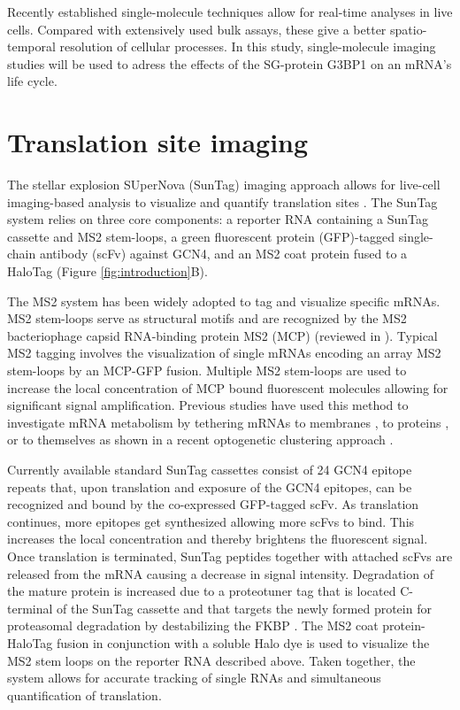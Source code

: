 Recently established single-molecule techniques allow for real-time analyses in live cells.
Compared with extensively used bulk assays, these give a better spatio-temporal resolution of cellular processes.
In this study, single-molecule imaging studies will be used to adress the effects of the SG-protein G3BP1 on an mRNA's life cycle.

    
\section{Translation site imaging} \label{translation_site_imaging}

The stellar explosion SUperNova (SunTag) imaging approach allows for live-cell imaging-based analysis to visualize and quantify translation sites \cite{tanenbaum_protein-tagging_2014}.
The SunTag system relies on three core components: a reporter RNA containing a SunTag cassette and MS2 stem-loops, a green fluorescent protein (GFP)-tagged single-chain antibody (scFv) against GCN4, and an MS2 coat protein fused to a HaloTag (Figure \ref{fig:introduction}B).

The MS2 system has been widely adopted to tag and visualize specific mRNAs.
MS2 stem-loops serve as structural motifs and are recognized by the MS2 bacteriophage capsid RNA-binding protein MS2 (MCP) (reviewed in \cite{george_intracellular_2018}).
Typical MS2 tagging involves the visualization of single mRNAs encoding an array MS2 stem-loops by an MCP-GFP fusion.
Multiple MS2 stem-loops are used to increase the local concentration of MCP bound fluorescent molecules allowing for significant signal amplification.
Previous studies have used this method to investigate mRNA metabolism by tethering mRNAs to membranes \cite{genz_association_2013}, to proteins \cite{bos_tethered_2016}, or to themselves as shown in a recent optogenetic clustering approach \cite{kim_optogenetic_2020}.

Currently available standard SunTag cassettes consist of 24 GCN4 epitope repeats that, upon translation and exposure of the GCN4 epitopes, can be recognized and bound by the co-expressed GFP-tagged scFv.
As translation continues, more epitopes get synthesized allowing more scFvs to bind.
This increases the local concentration and thereby brightens the fluorescent signal.
Once translation is terminated, SunTag peptides together with attached scFvs are released from the mRNA causing a decrease in signal intensity.
Degradation of the mature protein is increased due to a proteotuner tag that is located C-terminal of the SunTag cassette and that targets the newly formed protein for proteasomal degradation by destabilizing the FKBP \cite{azevedo_systematic_2012}.
The MS2 coat protein-HaloTag fusion in conjunction with a soluble Halo dye is used to visualize the MS2 stem loops on the reporter RNA described above.
Taken together, the system allows for accurate tracking of single RNAs and simultaneous quantification of translation.

